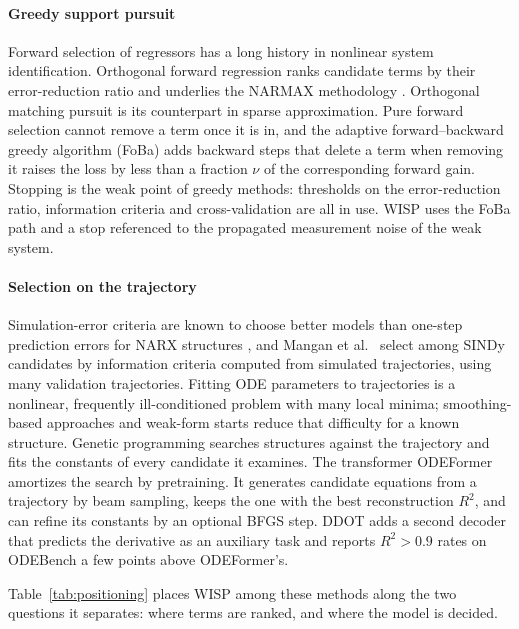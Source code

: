 \documentclass[10pt]{article}
\begin{document}
\paragraph{Greedy support pursuit} Forward selection of regressors has a long history in nonlinear system
identification. Orthogonal forward regression ranks candidate terms by their error-reduction ratio
\cite{korenberg1988,billings1989,chen1989} and underlies the NARMAX methodology \cite{billings2013}. Orthogonal matching pursuit
\cite{tropp2007} is its counterpart in sparse approximation. Pure forward selection cannot remove a term once it is in,
and the adaptive forward--backward greedy algorithm (FoBa) \cite{zhang2011} adds backward steps that delete a term
when removing it raises the loss by less than a fraction $\nu$ of the corresponding forward gain. Stopping is the weak point of greedy methods: thresholds on the
error-reduction ratio, information criteria \cite{schwarz1978,burnham2002} and cross-validation are all in use. WISP
uses the FoBa path and a stop referenced to the propagated measurement noise of the weak system.

\paragraph{Selection on the trajectory} Simulation-error criteria are known to choose better models than one-step
prediction errors for NARX structures \cite{piroddi2003}, and Mangan et al.\ \cite{mangan2017} select among SINDy
candidates by information criteria computed from simulated trajectories, using many validation trajectories.
Fitting ODE parameters to trajectories is a nonlinear, frequently ill-conditioned problem with many local minima;
smoothing-based approaches \cite{ramsay2007} and weak-form starts \cite{bortz2023} reduce that difficulty for a known
structure. Genetic programming \cite{bongard2007,schmidt2009,cranmer2023} searches structures against the trajectory
and fits the constants of every candidate it examines. The transformer ODEFormer \cite{dascoli2024} amortizes the search by pretraining. It generates candidate
equations from a trajectory by beam sampling, keeps the one with the best reconstruction $R^2$, and can refine its
constants by an optional BFGS step. DDOT \cite{chang2025} adds a second decoder that predicts the derivative as an
auxiliary task and reports $R^2>0.9$ rates on ODEBench a few points above ODEFormer's.

Table~\ref{tab:positioning} places WISP among these methods along the two questions it separates: where terms are
ranked, and where the model is decided.
\end{document}
